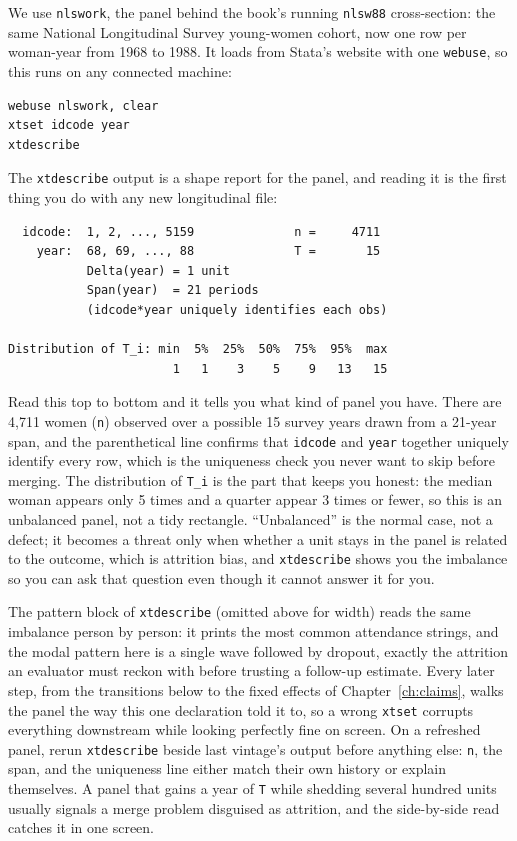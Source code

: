 We use \texttt{nlswork}, the panel behind the book's running \texttt{nlsw88} cross-section: the same National Longitudinal Survey young-women cohort, now one row per woman-year from 1968 to 1988. It loads from Stata's website with one \texttt{webuse}, so this runs on any connected machine:
\par
{\footnotesize
\begin{verbatim}
webuse nlswork, clear
xtset idcode year
xtdescribe
\end{verbatim}
}
The \texttt{xtdescribe} output is a shape report for the panel, and reading it is the first thing you do with any new longitudinal file:
\par
{\footnotesize
\begin{verbatim}
  idcode:  1, 2, ..., 5159              n =     4711
    year:  68, 69, ..., 88              T =       15
           Delta(year) = 1 unit
           Span(year)  = 21 periods
           (idcode*year uniquely identifies each obs)

Distribution of T_i: min  5%  25%  50%  75%  95%  max
                       1   1    3    5    9   13   15
\end{verbatim}
}
Read this top to bottom and it tells you what kind of panel you have. There are 4{,}711 women (\texttt{n}) observed over a possible 15 survey years drawn from a 21-year span, and the parenthetical line confirms that \texttt{idcode} and \texttt{year} together uniquely identify every row, which is the uniqueness check you never want to skip before merging. The distribution of \texttt{T\_i} is the part that keeps you honest: the median woman appears only 5 times and a quarter appear 3 times or fewer, so this is an unbalanced panel, not a tidy rectangle. \enquote{Unbalanced} is the normal case, not a defect; it becomes a threat only when whether a unit stays in the panel is related to the outcome, which is attrition bias, and \texttt{xtdescribe} shows you the imbalance so you can ask that question even though it cannot answer it for you.

The pattern block of \texttt{xtdescribe} (omitted above for width) reads the same imbalance person by person: it prints the most common attendance strings, and the modal pattern here is a single wave followed by dropout, exactly the attrition an evaluator must reckon with before trusting a follow-up estimate. Every later step, from the transitions below to the fixed effects of Chapter~\ref{ch:claims}, walks the panel the way this one declaration told it to, so a wrong \texttt{xtset} corrupts everything downstream while looking perfectly fine on screen. On a refreshed panel, rerun \texttt{xtdescribe} beside last vintage's output before anything else: \texttt{n}, the span, and the uniqueness line either match their own history or explain themselves. A panel that gains a year of \texttt{T} while shedding several hundred units usually signals a merge problem disguised as attrition, and the side-by-side read catches it in one screen.

